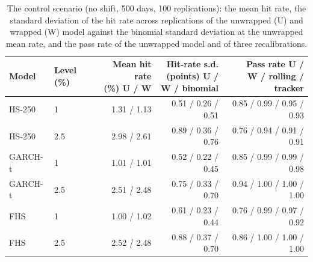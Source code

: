 \begin{table}[htbp]
\centering
\small
\caption{The control scenario (no shift, 500 days, 100 replications): the mean hit rate, the standard deviation of the hit rate across replications of the unwrapped (U) and wrapped (W) model against the binomial standard deviation at the unwrapped mean rate, and the pass rate of the unwrapped model and of three recalibrations.}
\label{tab:dispersion-null}
{\footnotesize\setlength{\tabcolsep}{4pt}
\begin{adjustbox}{max width=\textwidth}
\begin{tabular}{llrrr}
\toprule
Model & Level (\%) & \makecell[br]{Mean hit rate \\ (\%) U / W} & \makecell[br]{Hit-rate s.d. \\ (points) U / \\ W / binomial} & \makecell[br]{Pass rate U / \\ W / rolling / \\ tracker} \\
\midrule
HS-250 & 1 & 1.31 / 1.13 & 0.51 / 0.26 / 0.51 & 0.85 / 0.99 / 0.95 / 0.93 \\
HS-250 & 2.5 & 2.98 / 2.61 & 0.89 / 0.36 / 0.76 & 0.76 / 0.94 / 0.91 / 0.91 \\
GARCH-t & 1 & 1.01 / 1.01 & 0.52 / 0.22 / 0.45 & 0.85 / 0.99 / 0.99 / 0.98 \\
GARCH-t & 2.5 & 2.51 / 2.48 & 0.75 / 0.33 / 0.70 & 0.94 / 1.00 / 1.00 / 1.00 \\
FHS & 1 & 1.00 / 1.02 & 0.61 / 0.23 / 0.44 & 0.76 / 0.99 / 0.97 / 0.92 \\
FHS & 2.5 & 2.52 / 2.48 & 0.88 / 0.37 / 0.70 & 0.86 / 1.00 / 1.00 / 1.00 \\
\bottomrule
\end{tabular}
\end{adjustbox}}
\end{table}
